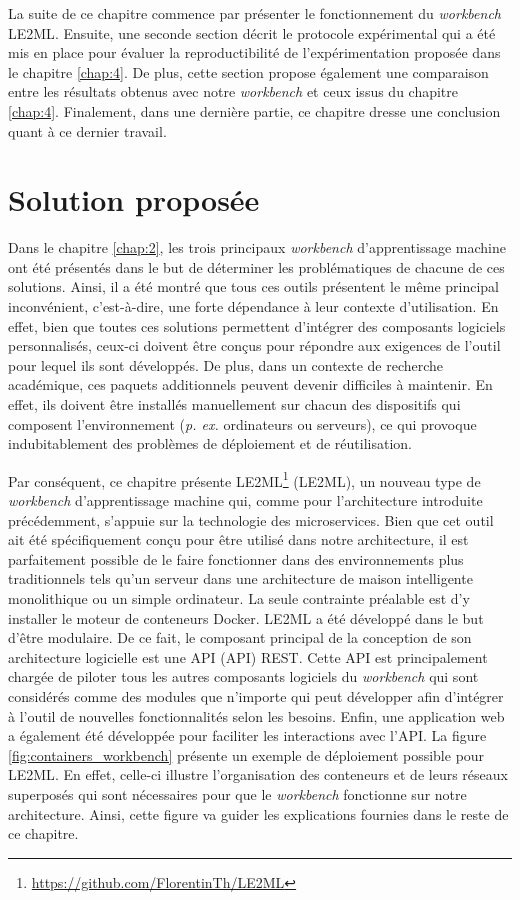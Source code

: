 La suite de ce chapitre commence par présenter le fonctionnement du \textit{workbench} \acs{LE2ML}. Ensuite, une seconde section décrit le protocole expérimental qui a été mis en place pour évaluer la reproductibilité de l'expérimentation proposée dans le chapitre \ref{chap:4}. De plus, cette section propose également une comparaison entre les résultats obtenus avec notre \textit{workbench} et ceux issus du chapitre \ref{chap:4}. Finalement, dans une dernière partie, ce chapitre dresse une conclusion quant à ce dernier travail.

\section{Solution proposée}

Dans le chapitre \ref{chap:2}, les trois principaux \textit{workbench} d'apprentissage machine ont été présentés dans le but de déterminer les problématiques de chacune de ces solutions. Ainsi, il a été montré que tous ces outils présentent le même principal inconvénient, c'est-à-dire, une forte dépendance à leur contexte d'utilisation. En effet, bien que toutes ces solutions permettent d'intégrer des composants logiciels personnalisés, ceux-ci doivent être conçus pour répondre aux exigences de l'outil pour lequel ils sont développés. De plus, dans un contexte de recherche académique, ces paquets additionnels peuvent devenir difficiles à maintenir. En effet, ils doivent être installés manuellement sur chacun des dispositifs qui composent l'environnement (\textit{p. ex.} ordinateurs ou serveurs), ce qui provoque indubitablement des problèmes de déploiement et de réutilisation.

Par conséquent, ce chapitre présente \acs{LE2ML}\footnote{\url{https://github.com/FlorentinTh/LE2ML}} (\acl{LE2ML}), un nouveau type de \textit{workbench} d'apprentissage machine qui, comme pour l'architecture introduite précédemment, s'appuie sur la technologie des microservices. Bien que cet outil ait été spécifiquement conçu pour être utilisé dans notre architecture, il est parfaitement possible de le faire fonctionner dans des environnements plus traditionnels tels qu'un serveur dans une architecture de maison intelligente monolithique ou un simple ordinateur. La seule contrainte préalable est d'y installer le moteur de conteneurs Docker. LE2ML a été développé dans le but d'être modulaire. De ce fait, le composant principal de la conception de son architecture logicielle est une \acs{API} (\acl{API}) \acs{REST}. Cette API est principalement chargée de piloter tous les autres composants logiciels du \textit{workbench} qui sont considérés comme des modules que n'importe qui peut développer afin d'intégrer à l'outil de nouvelles fonctionnalités selon les besoins. Enfin, une application web a également été développée pour faciliter les interactions avec l'\acs{API}. La figure \ref{fig:containers_workbench} présente un exemple de déploiement possible pour \acs{LE2ML}. En effet, celle-ci illustre l'organisation des conteneurs et de leurs réseaux superposés qui sont nécessaires pour que le \textit{workbench} fonctionne sur notre architecture. Ainsi, cette figure va guider les explications fournies dans le reste de ce chapitre.

